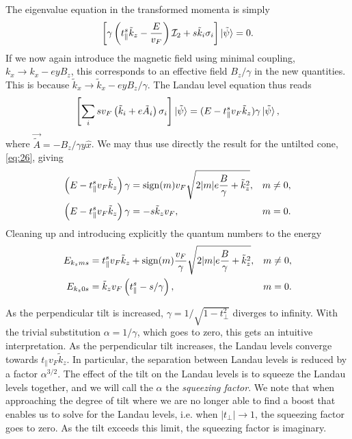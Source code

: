 The eigenvalue equation in the transformed momenta is simply
\begin{equation}
  \label{eq:42}
  \left[  \gamma \left( t^s_{\parallel} \tilde{k}_{z} - \frac{E}{v_{F}} \right) \mathcal{I}_{2} +
  s \tilde{k}_{i} \sigma _{i} \right] \ket{\tilde{\psi}}= 0.
\end{equation}
If we now again introduce the magnetic field using minimal coupling, \(k_{x} \to  k_{x} - ey B_{z} \), this corresponds to an effective field \(B_{z} /\gamma \) in the new quantities.
This is because \(\tilde{k}_{x} \to  \tilde{k}_{x} - e y B_{z} /\gamma \).
The Landau level equation thus reads
\begin{equation}
  \label{eq:43}
  \left[
  \sum\limits_{i} s v_{F} \left(\tilde{k}_{i} + e \tilde{A}_{i} \right) \sigma _{i}
\right  ] \ket{\tilde{\psi}} =
(E- t^s_{\parallel} v_{F} \tilde{k}_{z}) \gamma \ket{\tilde{\psi}},
\end{equation}
where \(\vec{\tilde{A}}=-B_{z}/ \gamma y \hat{x}\).
We may thus use directly the result for the untilted cone, \cref{eq:26}, giving
\begin{subequations}
  \label{eq:44}
  \begin{align}
    \left(E - t^s_{\parallel} v_{F} \tilde{k}_{z} \right) \gamma &= \operatorname{sign} (m) v_{F} \sqrt{2 |m| e \frac{B}{ \gamma }  + \tilde{k}_{z}^2}, & m \neq 0,\\
    \left(E - t^s_{\parallel} v_{F} \tilde{k}_{z} \right) \gamma &= - s   \tilde{k}_{z} v_{F}, & m=0.
  \end{align}
\end{subequations}
Cleaning up and introducing explicitly the quantum numbers to the energy
\begin{subequations}
  \label{eq:45}
  \begin{align}
    E_{k_z m s} &= t^s_{\parallel} v_F \tilde{k}_{z} + \operatorname{sign}(m) \frac{v_F}{\gamma} \sqrt{2 |m| e \frac{B}{\gamma}  + \tilde{k}_{z}^2}, & m\neq 0,\\
    E_{k_z 0 s} &= \tilde{k}_{z} v_{F} \left( t^s_{\parallel}  - s  / \gamma  \right), & m=0.
  \end{align}
\end{subequations}

As the perpendicular tilt is increased, \(\gamma = 1 / \sqrt{1-t_{\perp} ^{2}}\) diverges to infinity.
With the trivial substitution \(\alpha = 1 /\gamma \), which goes to zero, this gets an intuitive interpretation.
As the perpendicular tilt increases, the Landau levels converge towards \(t_{\parallel} v_{F} \tilde{k}_{z}\).
In particular, the separation between Landau levels is reduced by a factor \(\alpha ^{3 /2}\).
The effect of the tilt on the Landau levels is to squeeze the Landau levels together, and we will call the \(\alpha \) the \emph{squeezing factor}.
We note that when approaching the degree of tilt where we are no longer able to find a boost that enables us to solve for the Landau levels, i.e. when \( |t_{\perp}| \to 1\), the squeezing factor goes to zero.
As the tilt exceeds this limit, the squeezing factor is imaginary.


